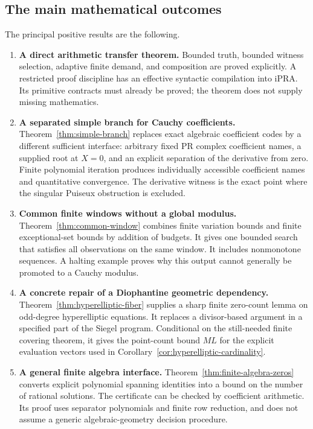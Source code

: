 \subsection{The main mathematical outcomes}

The principal positive results are the following.
\begin{enumerate}
\item \textbf{A direct arithmetic transfer theorem.}
Bounded truth, bounded witness selection, adaptive finite demand, and
composition are proved explicitly. A restricted proof discipline has an
effective syntactic compilation into iPRA. Its primitive contracts must
already be proved; the theorem does not supply missing mathematics.

\item \textbf{A separated simple branch for Cauchy coefficients.}
Theorem~\ref{thm:simple-branch} replaces exact algebraic coefficient
codes by a different sufficient interface: arbitrary fixed PR complex
coefficient names, a supplied root at $X=0$, and an explicit separation
of the derivative from zero. Finite polynomial iteration produces
individually accessible coefficient names and quantitative convergence.
The derivative witness is the exact point where the singular Puiseux
obstruction is excluded.

\item \textbf{Common finite windows without a global modulus.}
Theorem~\ref{thm:common-window} combines finite variation bounds and
finite exceptional-set bounds by addition of budgets. It gives one
bounded search that satisfies all observations on the same window.
It includes nonmonotone sequences. A halting example proves why this
output cannot generally be promoted to a Cauchy modulus.

\item \textbf{A concrete repair of a Diophantine geometric dependency.}
Theorem~\ref{thm:hyperelliptic-fiber} supplies a sharp finite zero-count
lemma on odd-degree hyperelliptic equations. It replaces a divisor-based
argument in a specified part of the Siegel program. Conditional on the
still-needed finite covering theorem, it gives the point-count bound
$ML$ for the explicit evaluation vectors used in
Corollary~\ref{cor:hyperelliptic-cardinality}.

\item \textbf{A general finite algebra interface.}
Theorem~\ref{thm:finite-algebra-zeros} converts explicit polynomial
spanning identities into a bound on the number of rational solutions.
The certificate can be checked by coefficient arithmetic. Its proof
uses separator polynomials and finite row reduction, and does not
assume a generic algebraic-geometry decision procedure.
\end{enumerate}

